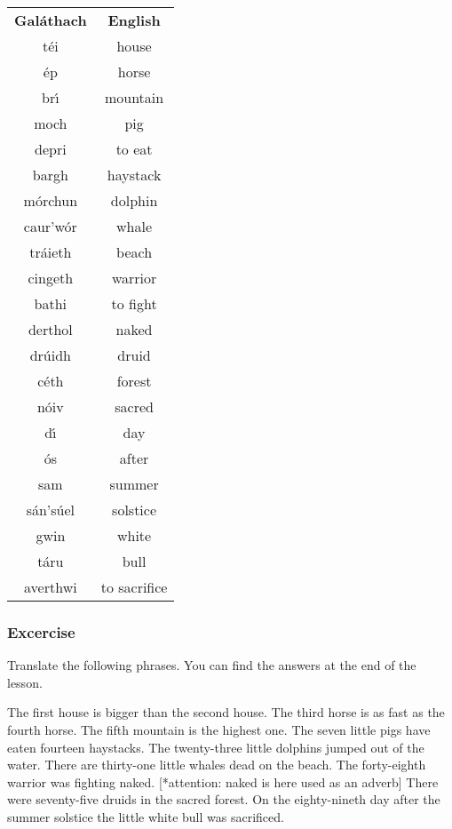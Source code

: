 \begin{table}[H]
\centering
\begin{tabular}{cc}
  \toprule
  \textbf{Gal\'{a}thach} & \textbf{English}\\
  t\'{e}i & house\\
  \'{e}p & horse\\
  br\'{\i} & mountain\\
  moch & pig\\
  depri & to eat\\
  bargh & haystack\\
  m\'{o}rchun & dolphin\\
  caur'w\'{o}r & whale\\
  tr\'{a}ieth & beach\\
  cingeth & warrior\\
  bathi & to fight\\
  derthol & naked\\
  dr\'{u}idh & druid\\
  c\'{e}th & forest\\
  n\'{o}iv & sacred\\
  d\'{\i} & day\\
  \'{o}s & after\\
  sam & summer\\
  s\'{a}n's\'{u}el & solstice\\
  gwin & white\\
  t\'{a}ru & bull\\
  averthwi & to sacrifice\\
  \bottomrule
\end{tabular}
\label{vocab_exercise_lesson17}
\end{table}
 
\subsubsection{Excercise}
Translate the following phrases. You can find the answers at the end of the lesson.

The first house is bigger than the second house.
The third horse is as fast as the fourth horse.
The fifth mountain is the highest one.
The seven little pigs have eaten fourteen haystacks.
The twenty-three little dolphins jumped out of the water.
There are thirty-one little whales dead on the beach.
The forty-eighth warrior was fighting naked. [*attention: naked is here used as an adverb]
There were seventy-five druids in the sacred forest.
On the eighty-nineth day after the summer solstice the little white bull was sacrificed.

